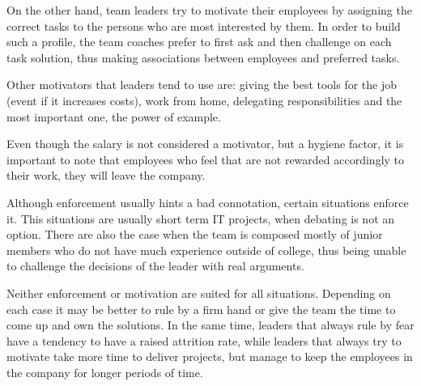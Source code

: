 On the other hand, team leaders try to motivate their employees by assigning the correct tasks to the persons who are most interested by them. In order to build such a profile, the team coaches prefer to first ask and then challenge on each task solution, thus making associations between employees and preferred tasks.

Other motivators that leaders tend to use are: giving the best tools for the job (event if it increases costs), work from home, delegating responsibilities and the most important one, the power of example.

Even though the salary is not considered a motivator, but a hygiene factor, it is important to note that employees who feel that are not rewarded accordingly to their work, they will leave the company. 

Although enforcement usually hints a bad connotation, certain situations enforce it. This situations are usually short term IT projects, when debating is not an option. There are also the case when the team is composed mostly of junior members who do not have much experience outside of college, thus being unable to challenge the decisions of the leader with real arguments. 

Neither enforcement or motivation are suited for all situations. Depending on each case it may be better to rule by a firm hand or give the team the time to come up and own the solutions. In the same time, leaders that always rule by fear have a tendency to have a raised attrition rate, while leaders that always try to motivate take more time to deliver projects, but manage to keep the employees in the company for longer periods of time.